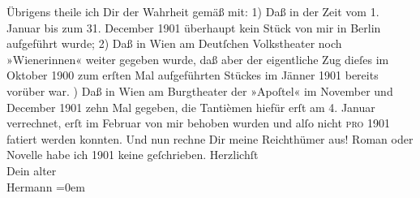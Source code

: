 \begin{ledgroupsized}[t]{13cm}
           \pstart
           Übrigens theile ich Dir der Wahrheit gemäß mit: 1) Daß in der Zeit vom 1. Januar bis
               zum 31. December 1901 überhaupt kein Stück von mir in Berlin aufgeführt wurde; {\pb}2) Daß in Wien am Deutſchen
                  Volkstheater noch »Wienerinnen« weiter
               gegeben wurde, daß aber der eigentliche Zug dieſes im Oktober 1900 zum erſten Mal
               aufgeführten Stückes im Jänner 1901 bereits vorüber war.\pend
           ) Daß in Wien am Burgtheater der »Apoſtel« im November
               und December 1901 zehn Mal gegeben, die {\pb}Tantièmen
               hiefür erſt am 4. Januar verrechnet, erſt im Februar von mir behoben wurden und alſo
               nicht \textsc{pro} 1901 fatiert werden konnten. Und nun rechne Dir
               meine Reichthümer aus! Roman oder Novelle habe ich 1901 keine geſchrieben.\pend
           \pstart
           Herzlichſt{\\[\baselineskip]}Dein alter{\\[\baselineskip]}\spacefill\mbox{Hermann}\pend
           \leftskip=0em{}
         
         \endnumbering{}\end{ledgroupsized}  \newcommand{\dateiname}{L01230}\newcommand{\titel}{Hermann Bahr an Arthur Schnitzler, 10. 7. [1902]}\newcommand{\editorInnen}{ Kurt Ifkovits,  Martin Anton Müller}
      